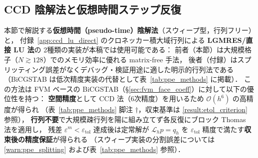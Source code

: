 %
\subsection{CCD 陰解法と仮想時間ステップ反復}
\label{sec:ppe_pseudotime}

本節で解説する\textbf{仮想時間（pseudo-time）陰解法}（スウィープ型，行列フリー）と，
付録~\ref{app:ccd_lu_direct} のクロネッカー積大域行列による \textbf{LGMRES/直接 LU 法}の
2種類の実装が本稿では使用可能である：
前者（本節）は大規模格子（$N \gtrsim 128$）でのメモリ効率に優れる matrix-free 手法，
後者（付録）はスプリッティング誤差がなくデバッグ・検証用途に適した明示的行列法である
（BiCGSTAB は低次精度実装の代替として表~\ref{tab:ppe_methods} に掲載）．
この方法は FVM ベースの BiCGSTAB（§\ref{sec:fvm_face_coeff}）に対して以下の優位性を持つ：
\textbf{空間精度}として CCD 法（6次精度）を用いるため $\mathcal{O}(h^6)$ の高精度が得られ
（表~\ref{tab:ppe_methods} 脚注 $\dagger$，収束基準は \ref{result:etol_criterion} 参照），
\textbf{行列不要}で大規模疎行列を陽に組み立てず各反復にブロック Thomas 法を適用し，
残差 $\varepsilon^m < \varepsilon_\text{tol}$ 達成後は定常解が $\mathcal{L}_h p = q_h$ を
$\varepsilon_\text{tol}$ 精度で満たす\textbf{収束後の精度保証}が得られる
（スウィープ実装の分割誤差については \ref{warn:ppe_splitting} および表~\ref{tab:ppe_methods} 参照）．

